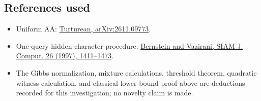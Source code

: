 \subsection{References used}\label{qm:references-used}

\begin{itemize}
\tightlist
\item
  Uniform AA: \href{https://arxiv.org/abs/2611.09773}{Turturean, arXiv:2611.09773}.
\item
  One-query hidden-character procedure: \href{https://epubs.siam.org/doi/10.1137/S0097539796300921}{Bernstein and Vazirani, SIAM J. Comput. 26 (1997), 1411--1473}.
\item
  The Gibbs normalization, mixture calculations, threshold theorem, quadratic witness calculation, and classical lower-bound proof above are deductions recorded for this investigation; no novelty claim is made.
\end{itemize}
